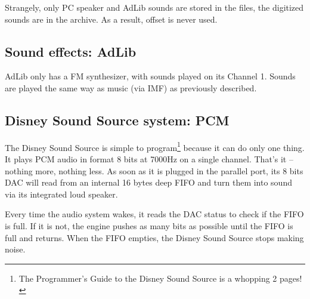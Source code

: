 \par
\begin{minipage}{\textwidth}

\end{minipage}
\par
Strangely, only PC speaker and AdLib sounds are stored in the  files, the digitized sounds are in the  archive. As a result, offset  is never used.\\
\par



\subsection{Sound effects: AdLib}
AdLib only has a FM synthesizer, with sounds played on its Channel 1. Sounds are played the same way as music (via IMF) as previously described.












\subsection{Disney Sound Source system: PCM}
The Disney Sound Source is simple to program\footnote{The Programmer's Guide to the Disney Sound Source is a whopping 2 pages!} because it can do only one thing. It plays PCM audio in format 8 bits at 7000Hz on a single channel. That's it -- nothing more, nothing less. As soon as it is plugged in the parallel port, its 8 bits DAC will read from an internal 16 bytes deep FIFO and turn them into sound via its integrated loud speaker.\\ 
\par
Every time the audio system wakes, it reads the DAC status to check if the FIFO is full. If it is not, the engine pushes as many bits as possible until the FIFO is full and returns. When the FIFO empties, the Disney Sound Source stops making noise.\\
\par










\par
